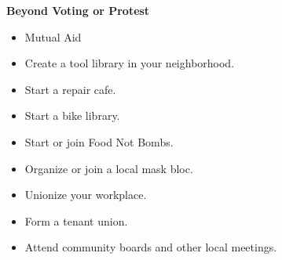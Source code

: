 \documentclass[10pt, oneside, a5paper]{article}
\author{}
\date{}
\begin{document}
{%
  \raggedright{}
  {\bfseries{}\Large{}Beyond Voting or Protest}
}

\begin{itemize}
\item Mutual Aid
\item Create a tool library in your neighborhood.
\item Start a repair cafe.
\item Start a bike library.


\item Start or join Food Not Bombs.

  
\item Organize or join a local mask bloc.

\item Unionize your workplace.
\item Form a tenant union.

\item Attend community boards and other local meetings.
\end{itemize}
\end{document}

